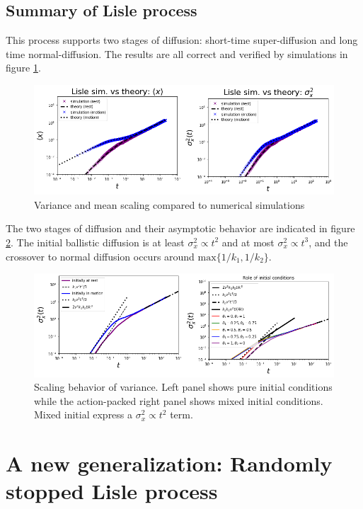 \documentclass[11pt]{article}
\begin{document}
\subsection{Summary of Lisle process}
This process supports two stages of diffusion: short-time super-diffusion and long time normal-diffusion.
The results are all correct and verified by simulations in figure \ref{fig:lislesims}.
\begin{figure}[h]
	\centering
	\includegraphics[width=\linewidth,keepaspectratio]{combo1.png}
	\caption{Variance and mean scaling compared to numerical simulations}
	\label{fig:lislesims}
\end{figure}
The two stages of diffusion and their asymptotic behavior are indicated in figure \ref{fig:lisledif}. The initial ballistic diffusion is at least $\sigma_x^2 \propto t^2$ and at most $\sigma_x^2 \propto t^3$, and the crossover to normal diffusion occurs around $\text{max}\{1/k_1,1/k_2\}.$
\begin{figure}[h]
	\centering
	\includegraphics[width=\linewidth,keepaspectratio]{combo2.png}
	\caption{Scaling behavior of variance. Left panel shows pure initial conditions while the action-packed right panel shows mixed initial conditions. Mixed initial express a $\sigma_x^2 \propto t^2$ term. }
	\label{fig:lisledif}
\end{figure}
\section{A new generalization: Randomly stopped Lisle process}
\end{document}
